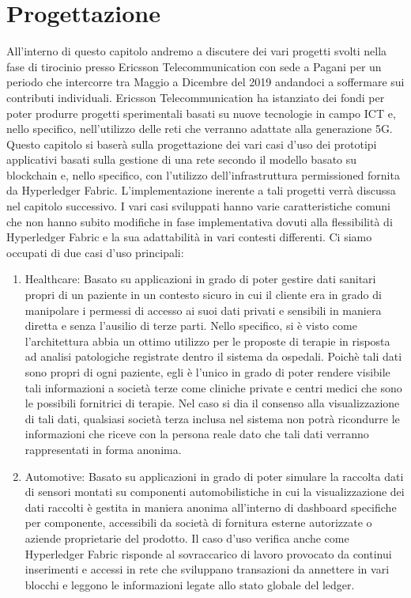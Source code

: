 \chapter{Progettazione}
All'interno di questo capitolo andremo a discutere dei vari progetti svolti nella fase di tirocinio presso Ericsson Telecommunication con sede a Pagani per un periodo che intercorre tra Maggio a Dicembre del 2019 andandoci a soffermare sui contributi individuali. Ericsson Telecommunication ha istanziato dei fondi per poter produrre progetti sperimentali basati su nuove tecnologie in campo ICT e, nello specifico, nell'utilizzo delle reti che verranno adattate alla generazione 5G. Questo capitolo si baserà sulla progettazione dei vari casi d'uso dei prototipi applicativi basati sulla gestione di una rete secondo il modello basato su blockchain e, nello specifico, con l'utilizzo dell'infrastruttura permissioned fornita da Hyperledger Fabric. L'implementazione inerente a tali progetti verrà discussa nel capitolo successivo. I vari casi sviluppati hanno varie caratteristiche comuni che non hanno subito modifiche in fase implementativa dovuti alla flessibilità di Hyperledger Fabric e la sua adattabilità in vari contesti differenti. Ci siamo occupati di due casi d'uso principali:
\begin{enumerate}
    \item Healthcare: Basato su applicazioni in grado di poter gestire dati sanitari propri di un paziente in un contesto sicuro in cui il cliente era in grado di manipolare i permessi di accesso ai suoi dati privati e sensibili in maniera diretta e senza l'ausilio di terze parti. Nello specifico, si è visto come l'architettura abbia un ottimo utilizzo per le proposte di terapie in risposta ad analisi patologiche registrate dentro il sistema da ospedali. Poichè tali dati sono propri di ogni paziente, egli è l'unico in grado di poter rendere visibile tali informazioni a società terze come cliniche private e centri medici che sono le possibili fornitrici di terapie. Nel caso si dia il consenso alla visualizzazione di tali dati, qualsiasi società terza inclusa nel sistema non potrà ricondurre le informazioni che riceve con la persona reale dato che tali dati verranno rappresentati in forma anonima. 
    \item Automotive: Basato su applicazioni in grado di poter simulare la raccolta dati di sensori montati su componenti automobilistiche in cui la visualizzazione dei dati raccolti è gestita in maniera anonima all'interno di dashboard specifiche per componente, accessibili da società di fornitura esterne autorizzate o aziende proprietarie del prodotto. Il caso d'uso verifica anche come Hyperledger Fabric risponde al sovraccarico di lavoro provocato da continui inserimenti e accessi in rete che sviluppano transazioni da annettere in vari blocchi e leggono le informazioni legate allo stato globale del ledger.
\end{enumerate}
